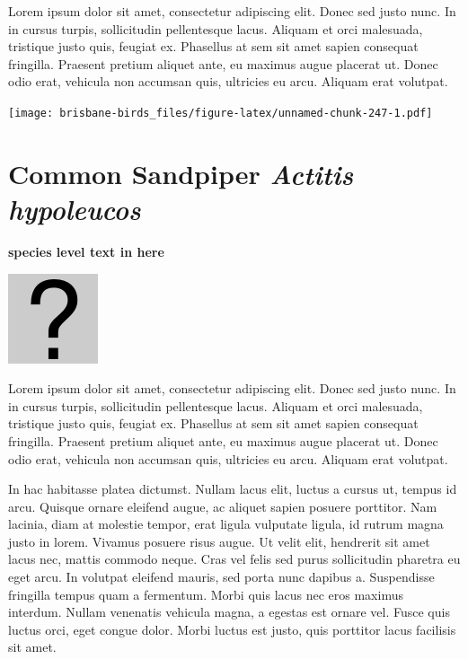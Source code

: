 \documentclass[]{book}
\let\origfigure\figure
\let\endorigfigure\endfigure
\renewenvironment{figure}[1][2] {
  \expandafter\origfigure\expandafter[H]
} {
  \endorigfigure
}
\begin{document}
Lorem ipsum dolor sit amet, consectetur adipiscing elit. Donec sed justo
nunc. In in cursus turpis, sollicitudin pellentesque lacus. Aliquam et
orci malesuada, tristique justo quis, feugiat ex. Phasellus at sem sit
amet sapien consequat fringilla. Praesent pretium aliquet ante, eu
maximus augue placerat ut. Donec odio erat, vehicula non accumsan quis,
ultricies eu arcu. Aliquam erat volutpat.

\texttt{[image: brisbane-birds\_files/figure-latex/unnamed-chunk-247-1.pdf]}

\section{\texorpdfstring{Common Sandpiper \emph{Actitis
hypoleucos}}{Common Sandpiper Actitis hypoleucos}}\label{common-sandpiper-actitis-hypoleucos}

\textbf{species level text in here}

\begin{figure}
\centering
\includegraphics{assets/missing.png}
\caption{No image for species}
\end{figure}

Lorem ipsum dolor sit amet, consectetur adipiscing elit. Donec sed justo
nunc. In in cursus turpis, sollicitudin pellentesque lacus. Aliquam et
orci malesuada, tristique justo quis, feugiat ex. Phasellus at sem sit
amet sapien consequat fringilla. Praesent pretium aliquet ante, eu
maximus augue placerat ut. Donec odio erat, vehicula non accumsan quis,
ultricies eu arcu. Aliquam erat volutpat.

In hac habitasse platea dictumst. Nullam lacus elit, luctus a cursus ut,
tempus id arcu. Quisque ornare eleifend augue, ac aliquet sapien posuere
porttitor. Nam lacinia, diam at molestie tempor, erat ligula vulputate
ligula, id rutrum magna justo in lorem. Vivamus posuere risus augue. Ut
velit elit, hendrerit sit amet lacus nec, mattis commodo neque. Cras vel
felis sed purus sollicitudin pharetra eu eget arcu. In volutpat eleifend
mauris, sed porta nunc dapibus a. Suspendisse fringilla tempus quam a
fermentum. Morbi quis lacus nec eros maximus interdum. Nullam venenatis
vehicula magna, a egestas est ornare vel. Fusce quis luctus orci, eget
congue dolor. Morbi luctus est justo, quis porttitor lacus facilisis sit
amet.
\end{document}
